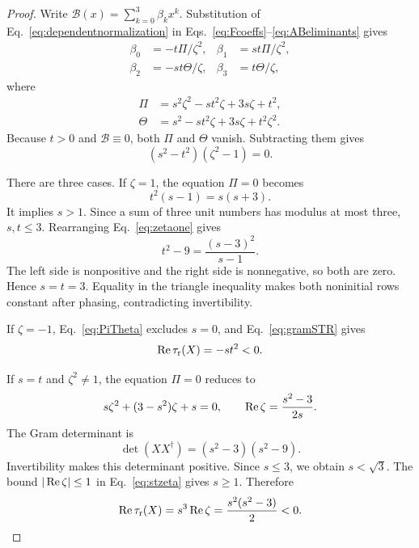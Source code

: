 \begin{proof}
Write $\mathcal B(x)=\sum_{k=0}^{3}\beta_kx^k$.  Substitution of Eq.~\eqref{eq:dependentnormalization} in Eqs.~\eqref{eq:Fcoeffs}--\eqref{eq:ABeliminants} gives
\begin{equation}
\begin{aligned}
\beta_0&=-t\Pi/\zeta^2,&
\beta_1&=st\Pi/\zeta^2,\\
\beta_2&=-st\Theta/\zeta,&
\beta_3&=t\Theta/\zeta,
\end{aligned}
\label{eq:dependentbetas}
\end{equation}
where
\begin{equation}
\begin{aligned}
\Pi&=s^2\zeta^2-st^2\zeta+3s\zeta+t^2,\\
\Theta&=s^2-st^2\zeta+3s\zeta+t^2\zeta^2.
\end{aligned}
\label{eq:PiTheta}
\end{equation}
Because $t>0$ and $\mathcal B\equiv0$, both $\Pi$ and $\Theta$ vanish. Subtracting them gives
\begin{equation}
(s^2-t^2)(\zeta^2-1)=0.
\label{eq:dependentfactor}
\end{equation}

There are three cases.  If $\zeta=1$, the equation $\Pi=0$ becomes
\begin{equation}
t^2(s-1)=s(s+3).
\label{eq:zetaone}
\end{equation}
It implies $s>1$.  Since a sum of three unit numbers has modulus at most three, $s,t\leq3$.  Rearranging Eq.~\eqref{eq:zetaone} gives
\begin{equation}
t^2-9=\frac{(s-3)^2}{s-1}.
\label{eq:zetaonebound}
\end{equation}
The left side is nonpositive and the right side is nonnegative, so both are zero.  Hence $s=t=3$.  Equality in the triangle inequality makes both noninitial rows constant after phasing, contradicting invertibility.

If $\zeta=-1$, Eq.~\eqref{eq:PiTheta} excludes $s=0$, and Eq.~\eqref{eq:gramSTR} gives
\begin{equation}
\operatorname{Re}\tau_{\rm r}(X)=-st^2<0.
\label{eq:zetaminustau}
\end{equation}

If $s=t$ and $\zeta^2\neq1$, the equation $\Pi=0$ reduces to
\begin{equation}
s\zeta^2+(3-s^2)\zeta+s=0,
\qquad
\operatorname{Re}\zeta=\frac{s^2-3}{2s}.
\label{eq:stzeta}
\end{equation}
The Gram determinant is
\begin{equation}
\det(XX^{\dagger})=(s^2-3)(s^2-9).
\label{eq:dependentdet}
\end{equation}
Invertibility makes this determinant positive.  Since $s\leq3$, we obtain $s<\sqrt3$.  The bound $|\operatorname{Re}\zeta|\leq1$ in Eq.~\eqref{eq:stzeta} gives $s\geq1$.  Therefore
\begin{equation}
\operatorname{Re}\tau_{\rm r}(X)
=s^3\operatorname{Re}\zeta
=\frac{s^2(s^2-3)}{2}<0.
\label{eq:dependentnegative}
\end{equation}


\end{proof}
